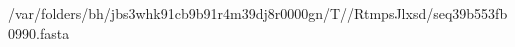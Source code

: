 \documentclass[10pt]{article}
\begin{document}
\begin{texshade}{/var/folders/bh/jbs3whk91cb9b91r4m39dj8r0000gn/T//RtmpsJlxsd/seq39b553fb0990.fasta}
\hidelogoscale
\hidenames
{}
\end{texshade}
\end{document}
